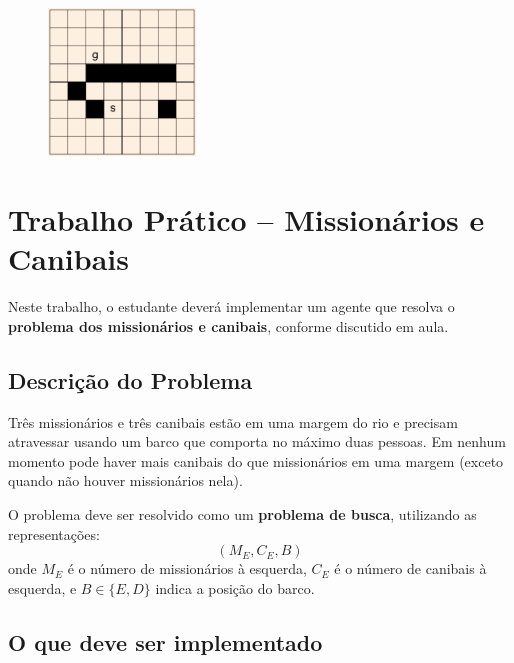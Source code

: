 \documentclass[9pt,a4paper]{extarticle}
\begin{document}
        \begin{figure}[!ht]
      \centering
      \includegraphics[width=0.35\textwidth]{grid.png}
    \end{figure}

\pagebreak
\section{Trabalho Prático -- Missionários e Canibais}

Neste trabalho, o estudante deverá implementar um agente que resolva o \textbf{problema dos missionários e canibais}, conforme discutido em aula.

\subsection*{Descrição do Problema}

Três missionários e três canibais estão em uma margem do rio e precisam atravessar usando um barco que comporta no máximo duas pessoas.  
Em nenhum momento pode haver mais canibais do que missionários em uma margem (exceto quando não houver missionários nela).  

O problema deve ser resolvido como um \textbf{problema de busca}, utilizando as representações:
\[
(M_E, C_E, B)
\]
onde $M_E$ é o número de missionários à esquerda, $C_E$ é o número de canibais à esquerda, e $B \in \{E, D\}$ indica a posição do barco.

\subsection*{O que deve ser implementado}
\end{document}
